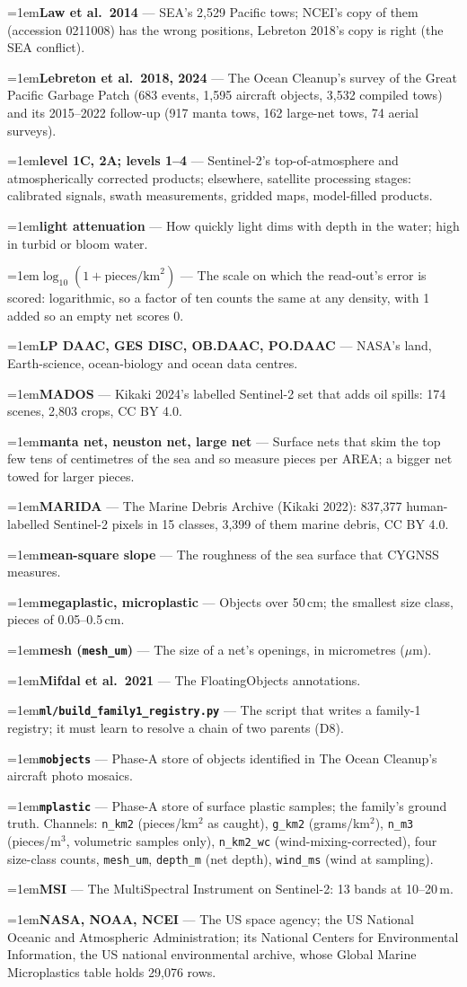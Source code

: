 \documentclass[10pt]{article}
\newcommand{\code}[1]{\texttt{#1}}
\newcommand{\gl}[2]{\par\hangindent=1em\hangafter=1\textbf{#1} --- #2\par}
\begin{document}
\gl{Law et al.\ 2014}{SEA's 2,529 Pacific tows; NCEI's copy of them (accession 0211008) has the wrong positions, Lebreton 2018's copy is right (the SEA conflict).}
\gl{Lebreton et al.\ 2018, 2024}{The Ocean Cleanup's survey of the Great Pacific Garbage Patch (683 events, 1,595 aircraft objects, 3,532 compiled tows) and its 2015--2022 follow-up (917 manta tows, 162 large-net tows, 74 aerial surveys).}
\gl{level 1C, 2A; levels 1--4}{Sentinel-2's top-of-atmosphere and atmospherically corrected products; elsewhere, satellite processing stages: calibrated signals, swath measurements, gridded maps, model-filled products.}
\gl{light attenuation}{How quickly light dims with depth in the water; high in turbid or bloom water.}
\gl{$\log_{10}(1 + \text{pieces/km}^2)$}{The scale on which the read-out's error is scored: logarithmic, so a factor of ten counts the same at any density, with 1 added so an empty net scores 0.}
\gl{LP DAAC, GES DISC, OB.DAAC, PO.DAAC}{NASA's land, Earth-science, ocean-biology and ocean data centres.}
\gl{MADOS}{Kikaki 2024's labelled Sentinel-2 set that adds oil spills: 174 scenes, 2,803 crops, CC BY 4.0.}
\gl{manta net, neuston net, large net}{Surface nets that skim the top few tens of centimetres of the sea and so measure pieces per AREA; a bigger net towed for larger pieces.}
\gl{MARIDA}{The Marine Debris Archive (Kikaki 2022): 837,377 human-labelled Sentinel-2 pixels in 15 classes, 3,399 of them marine debris, CC BY 4.0.}
\gl{mean-square slope}{The roughness of the sea surface that CYGNSS measures.}
\gl{megaplastic, microplastic}{Objects over 50\,cm; the smallest size class, pieces of 0.05--0.5\,cm.}
\gl{mesh (\code{mesh\_um})}{The size of a net's openings, in micrometres ($\mu$m).}
\gl{Mifdal et al.\ 2021}{The FloatingObjects annotations.}
\gl{\code{ml/build\_family1\_registry.py}}{The script that writes a family-1 registry; it must learn to resolve a chain of two parents (D8).}
\gl{\code{mobjects}}{Phase-A store of objects identified in The Ocean Cleanup's aircraft photo mosaics.}
\gl{\code{mplastic}}{Phase-A store of surface plastic samples; the family's ground truth. Channels: \code{n\_km2} (pieces/km$^2$ as caught), \code{g\_km2} (grams/km$^2$), \code{n\_m3} (pieces/m$^3$, volumetric samples only), \code{n\_km2\_wc} (wind-mixing-corrected), four size-class counts, \code{mesh\_um}, \code{depth\_m} (net depth), \code{wind\_ms} (wind at sampling).}
\gl{MSI}{The MultiSpectral Instrument on Sentinel-2: 13 bands at 10--20\,m.}
\gl{NASA, NOAA, NCEI}{The US space agency; the US National Oceanic and Atmospheric Administration; its National Centers for Environmental Information, the US national environmental archive, whose Global Marine Microplastics table holds 29,076 rows.}
\end{document}
